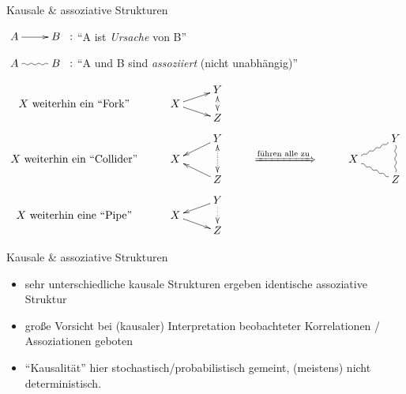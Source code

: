 \documentclass[
  10pt,
  ignorenonframetext,
]{beamer}
\providecommand{\tightlist}{%
  \setlength{\itemsep}{0pt}\setlength{\parskip}{0pt}}
\begin{document}
\begin{frame}{Kausale \& assoziative Strukturen}
\protect\hypertarget{kausale-assoziative-strukturen-3}{}
\begin{small}
$\xymatrix{A \ar[r] & B} \;:$ ``A ist \textit{Ursache} von B''  

$\xymatrix{A \ar@{~}[r] & B}\;:$ ``A und B sind \textit{assoziiert} (nicht unabhängig)'' 

\begin{displaymath}
    \xymatrix@R-2pc{
      &                   & Y \ar@{<.>}[dd] &  & &\\
  \text{$X$ weiterhin ein ``Fork''} &  X \ar[dr]\ar[ur] &   &  & &\\
      &                   & Z &  & &\\
      &                   &   &  & &\\
      &                   & Y \ar[dl]\ar@{<.}[dd]\ar@{.>}[dd] & & & Y\ar@{~}[dd]\\
   \text{$X$ weiterhin ein ``Collider''} &  X  &  & \xRightarrow{\text{führen alle zu}}  & X \ar@{~}[dr]\ar@{~}[ur] &\\
      &                   & Z \ar[ul] & & & Z\\
      &                   &   & & &\\
      &                   & Y\ar[dl]\ar@{.>}[dd] & & &\\
   \text{$X$ weiterhin eine ``Pipe''}   &  X \ar[dr]  &   & & &\\
      &                   & Z  & & &
}  
\end{displaymath}
\end{small}
\end{frame}

\begin{frame}{Kausale \& assoziative Strukturen}
\protect\hypertarget{kausale-assoziative-strukturen-4}{}
\begin{itemize}
\tightlist
\item
  sehr unterschiedliche kausale Strukturen ergeben identische
  assoziative Struktur
\item
  große Vorsicht bei (kausaler) Interpretation beobachteter
  Korrelationen / Assoziationen geboten
\item
  ``Kausalität'' hier stochastisch/probabilistisch gemeint, (meistens)
  nicht deterministisch.
\end{itemize}
\end{frame}
\end{document}
